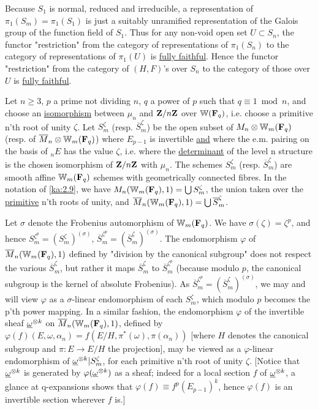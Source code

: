  Because $S_1$ is normal, reduced and irreducible, a
representation of $\pi_1(S_m)=\pi_1(S_1)$ is just a suitably unramified
representation of the Galois group of the function field of $S_1$. Thus for any
non-void open set $U\subset S_n$, the functor "restriction" from the category of
representations of $\pi_1(S_n)$ to the category of representations of
$\pi_1(U)$ is \uline{fully faithful}. Hence the functor "restriction" from the
category of $(H,F)$'s over $S_n$ to the category of those over $U$ is \uline{fully
faithful}.


 Let $n\geq 3$, $p$ a prime not dividing $n$, $q$ a power of $p$
such that $q\equiv 1 \bmod n$, and choose an \uline{isomorphism} between $\mu_n$
and $\mathbf{Z}/n\mathbf{Z}$ over $\mathbb{W}(\mathbf{F}_q)$, i.e. choose a primitive n'th root of unity
$\zeta$. Let $S_m^\zeta$ (resp. $\overline{S}_m^\zeta$) be the open subset of
$M_n\otimes\mathbb{W}_m(\mathbf{F}_q)$ (resp. of $\overline{M}_n\otimes\mathbb{W}_m(\mathbf{F}_q)$) where $E_{p-1}$ is
invertible \uline{and} where the e.m. pairing on the basis of ${}_nE$ has the
value $\zeta$, i.e. where the \uline{determinant} of the level n structure is
the chosen isomorphism of $\mathbf{Z}/n\mathbf{Z}$ with $\mu_n$. The schemes $S_m^\zeta$ (resp.
$\overline{S}_m^\zeta$) are smooth affine $\mathbb{W}_m(\mathbf{F}_q)$ schemes with
geometrically connected fibres. In the notation of \eqref{ka:2.9}, we have
$M_n(\mathbb{W}_m(\mathbf{F}_q),1)=\bigcup S_m^\zeta$, the union taken over the \uline{primitive}
n'th roots of unity, and $\overline{M}_n(\mathbb{W}_m(\mathbf{F}_q),1)=\bigcup\overline{S}_m^\zeta$.

Let $\sigma$ denote the Frobenius automorphism of $\mathbb{W}_m(\mathbf{F}_q)$. We have
$\sigma(\zeta)=\zeta^p$, and hence $S_m^{\zeta^p}=(S_m^\zeta)^{(\sigma)}$,
$\overline{S}_m^{\zeta^p}=(\overline{S}_m^\zeta)^{(\sigma)}$. The endomorphism
$\varphi$ of $\overline{M}_n(\mathbb{W}_m(\mathbf{F}_q),1)$ defined by "division by the canonical
subgroup" does not respect the various $\overline{S}_m^\zeta$, but rather it
maps $\overline{S}_m^\zeta$ to $\overline{S}_m^{\zeta^p}$ (because modulo $p$,
the canonical subgroup is the kernel of absolute Frobenius). As
$\overline{S}_m^{\zeta^p}=(\overline{S}_m^\zeta)^{(\sigma)}$, we may and will
view $\varphi$ as a $\sigma$-linear endomorphism of each $S_m^\zeta$, which
modulo $p$ becomes the p'th power mapping. In a similar fashion, the
endomorphism $\varphi$ of the invertible sheaf $\underline{\omega}^{\otimes k}$ on
$\overline{M}_n(\mathbb{W}_m(\mathbf{F}_q),1)$, defined by
$\varphi(f)(E,\omega,\alpha_n)=f(E/H,\pi^*(\omega),\pi(\alpha_n))$ [where $H$
denotes the canonical subgroup and $\pi\colon E\to E/H$ the projection], may be
viewed as a $\varphi$-linear endomorphism of $\underline{\omega}^{\otimes k}|S_m^\zeta$, for
each primitive n'th root of unity $\zeta$. [Notice that $\underline{\omega}^{\otimes k}$ is
generated by $\varphi(\underline{\omega}^{\otimes k})$ as a sheaf; indeed for a local section
$f$ of $\underline{\omega}^{\otimes k}$, a glance at q-expansions shows that
$\varphi(f)\equiv f^p(E_{p-1})^k$, hence $\varphi(f)$ is an invertible section
wherever $f$ is.]


